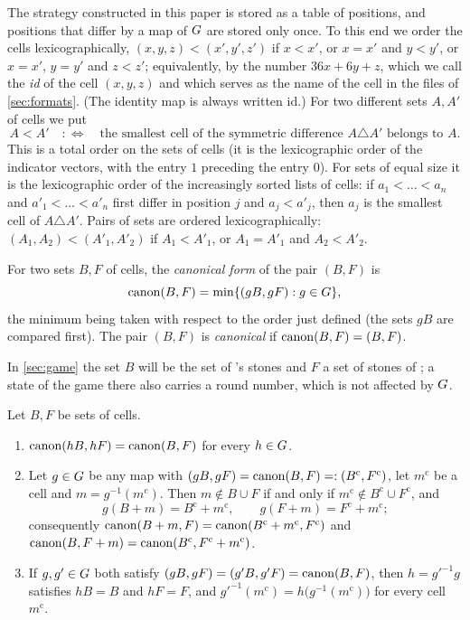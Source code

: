 The strategy constructed in this paper is stored as a table of positions, and positions that differ by a
map of $G$ are stored only once. To this end we order the cells lexicographically, $(x,y,z)<(x',y',z')$
if $x<x'$, or $x=x'$ and $y<y'$, or $x=x'$, $y=y'$ and $z<z'$; equivalently, by the number $36x+6y+z$,
which we call the \emph{id} of the cell $(x,y,z)$ and which serves as the name of the cell in the files of
\cref{sec:formats}. (The identity map is always written $\mathrm{id}$.) For two different sets $A,A'$ of
cells we put
\[
  A<A' \quad:\Longleftrightarrow\quad \text{the smallest cell of the symmetric difference }A\triangle A'
  \text{ belongs to }A .
\]
This is a total order on the sets of cells (it is the lexicographic order of the indicator vectors, with
the entry $1$ preceding the entry $0$). For sets of equal size it is the lexicographic order of the
increasingly sorted lists of cells: if $a_1<\dots<a_n$ and $a'_1<\dots<a'_n$ first differ in position $j$
and $a_j<a'_j$, then $a_j$ is the smallest cell of $A\triangle A'$. Pairs of sets are ordered
lexicographically: $(A_1,A_2)<(A'_1,A'_2)$ if $A_1<A'_1$, or $A_1=A'_1$ and $A_2<A'_2$.

\begin{definition}\label{def:canon}
For two sets $B,F$ of cells, the \emph{canonical form} of the pair $(B,F)$ is
\[
  \operatorname{canon}(B,F)=\min\{(gB,gF) : g\in G\},
\]
the minimum being taken with respect to the order just defined (the sets $gB$ are compared first). The
pair $(B,F)$ is \emph{canonical} if $\operatorname{canon}(B,F)=(B,F)$.
\end{definition}

In \cref{sec:game} the set $B$ will be the set of \Breaker's stones and $F$ a set of stones of \Maker; a
state of the game there also carries a round number, which is not affected by $G$.

\begin{lemma}\label{lem:canon}
Let $B,F$ be sets of cells.
\begin{enumerate}[label=\textup{(\alph*)}]
\item $\operatorname{canon}(hB,hF)=\operatorname{canon}(B,F)$ for every $h\in G$.
\item Let $g\in G$ be any map with $(gB,gF)=\operatorname{canon}(B,F)=:(B^{\mathrm c},F^{\mathrm c})$, let
      $m^{\mathrm c}$ be a cell and $m=g^{-1}(m^{\mathrm c})$. Then $m\notin B\cup F$ if and only if
      $m^{\mathrm c}\notin B^{\mathrm c}\cup F^{\mathrm c}$, and
      \[
        g(B+m)=B^{\mathrm c}+m^{\mathrm c},\qquad g(F+m)=F^{\mathrm c}+m^{\mathrm c};
      \]
      consequently $\operatorname{canon}(B+m,F)=\operatorname{canon}(B^{\mathrm c}+m^{\mathrm c},F^{\mathrm c})$ and
      $\operatorname{canon}(B,F+m)=\operatorname{canon}(B^{\mathrm c},F^{\mathrm c}+m^{\mathrm c})$.
\item If $g,g'\in G$ both satisfy $(gB,gF)=(g'B,g'F)=\operatorname{canon}(B,F)$, then $h=g'^{-1}g$ satisfies $hB=B$
      and $hF=F$, and $g'^{-1}(m^{\mathrm c})=h\bigl(g^{-1}(m^{\mathrm c})\bigr)$ for every cell
      $m^{\mathrm c}$.
\end{enumerate}
\end{lemma}

